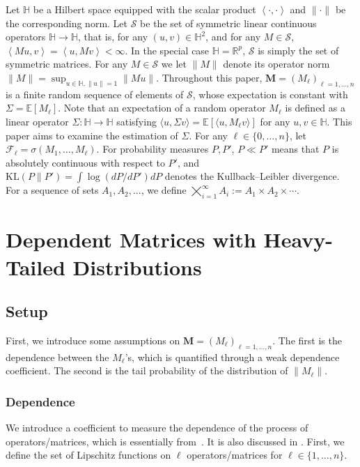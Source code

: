 \documentclass[11pt,a4paper]{article}
\theoremstyle{remark}
\theoremstyle{definition}
\theoremstyle{definition}
\newcommand{\rc}{\color{black}}
\begin{document}
\begin{bibunit}[apalike]
Let $\mathbb{H}$ be a Hilbert space equipped with the scalar product $\left<\cdot,\cdot \right>$ and $\|\cdot\|$ be the corresponding norm. Let $\mathcal{S}$ be the set of symmetric linear continuous operators $\mathbb{H}\rightarrow\mathbb{H}$, that is, for any $(u,v)\in\mathbb{H}^2$, and for any $M\in\mathcal{S}$, $\left<Mu,v\right>=\left<u,Mv\right>< \infty$. In the special case $\mathbb{H}=\mathbb{R}^p$, $\mathcal{S}$ is simply the set of symmetric matrices. For any $M\in\mathcal{S}$ we let $\|M\|$ denote its operator norm $\|M\|=\sup_{u\in\mathbb{H},\|u\|=1}\|Mu\|$.
Throughout this paper, $\mathbf{M}=(M_\ell)_{\ell=1,\dots,n}$ is a finite random sequence of elements of $\mathcal{S}$, whose expectation is constant with $\Sigma = \mathbb{E}[M_\ell]$. 
{\rc 
Note that an expectation of a random operator $M_\ell$ is defined as a linear operator $\Sigma: \mathbb{H} \to \mathbb{H}$ satisfying $\langle u, \Sigma v \rangle = \mathbb{E}[\langle u, M_\ell v \rangle]$ for any $u,v \in \mathbb{H}$.
}
This paper aims to examine the estimation of $\Sigma$. For any $\ell\in\{0,\dots,n\}$, let $\mathcal{F}_{\ell}=\sigma(M_1,\dots,M_\ell)$.
For probability measures $P,P'$, $P \ll P'$ means that $P$ is absolutely continuous with respect to $P'$, and $\mathrm{KL}(P \| P') = \int \log (dP / dP') dP$ denotes the Kullback--Leibler divergence.
{\rc For a sequence of sets $A_1,A_2,...$, we define $\bigtimes_{i=1}^\infty A_i := A_1 \times A_2 \times \cdots$. }

\section{Dependent Matrices with Heavy-Tailed Distributions}
\label{sec:setting}




\subsection{Setup}

First, we introduce some assumptions on $\mathbf{M}=(M_\ell)_{\ell=1,\dots,n}$. The first is the dependence between the  $M_\ell$'s, which is quantified through a weak dependence coefficient. The second is the tail probability of the distribution of $\|M_\ell\|$.


\subsubsection{Dependence}
We introduce a coefficient to measure the dependence of the process of operators/matrices, which is essentially from~\citep{rio2000inegalites}. It is also discussed in \citep{dedecker2007weak}.
First, we define the set of Lipschitz functions on $\ell$ operators/matrices for $\ell \in\{ 1,\ldots,n\}$.





\end{bibunit}
\end{document}
